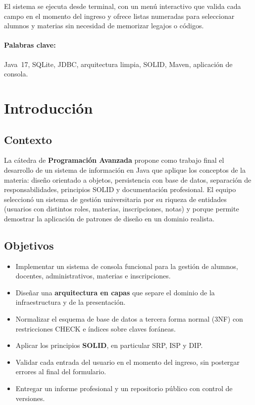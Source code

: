\documentclass[12pt,a4paper]{article}
\begin{document}
El sistema se ejecuta desde terminal, con un menú interactivo que valida
cada campo en el momento del ingreso y ofrece listas numeradas para
seleccionar alumnos y materias sin necesidad de memorizar legajos o códigos.

\paragraph{Palabras clave:} Java~17, SQLite, JDBC, arquitectura limpia,
SOLID, Maven, aplicación de consola.

\section{Introducción}

\subsection{Contexto}

La cátedra de \textbf{Programación Avanzada} propone como trabajo final el
desarrollo de un sistema de información en Java que aplique los conceptos de
la materia: diseño orientado a objetos, persistencia con base de datos,
separación de responsabilidades, principios SOLID y documentación
profesional. El equipo seleccionó un sistema de gestión universitaria por su
riqueza de entidades (usuarios con distintos roles, materias, inscripciones,
notas) y porque permite demostrar la aplicación de patrones de diseño en un
dominio realista.

\subsection{Objetivos}

\begin{itemize}
    \item Implementar un sistema de consola funcional para la gestión de
        alumnos, docentes, administrativos, materias e inscripciones.
    \item Diseñar una \textbf{arquitectura en capas} que separe el dominio
        de la infraestructura y de la presentación.
    \item Normalizar el esquema de base de datos a tercera forma normal
        (3NF) con restricciones CHECK e índices sobre claves foráneas.
    \item Aplicar los principios \textbf{SOLID}, en particular SRP, ISP y
        DIP.
    \item Validar cada entrada del usuario en el momento del ingreso, sin
        postergar errores al final del formulario.
    \item Entregar un informe profesional y un repositorio público con
        control de versiones.
\end{itemize}
\end{document}
